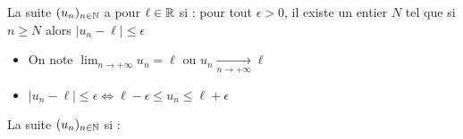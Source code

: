 \begin{frame}

\begin{mydefinition}
\label{def_lim}
  La suite $(u_n)_{n\in \mathbb{N}}$ a pour  $\ell\in \mathbb{R}$ si : 
pour tout $\epsilon >0$, il existe un entier $N$ tel que si $n\geq N$ alors 
$\lvert u_n-\ell\rvert\leq\epsilon$
\pause
{}
\end{mydefinition}

\pause
\bigskip
 \begin{itemize}
    \item On note \quad $\displaystyle \lim_{n\to +\infty}u_n=\ell$ \quad ou \quad $u_n\xrightarrow[n\to +\infty]{} \ell$
\pause
\medskip
    \item $|u_n-\ell| \le \epsilon \iff \ell-\epsilon \le u_n \le \ell +\epsilon$
 \end{itemize}
\end{frame}

\begin{frame}


\pause    
    


\end{frame}


\begin{frame}
\begin{mydefinition}  
 La suite $(u_n)_{n\in \mathbb{N}}$  si :


    
\end{mydefinition}



\pause


\end{frame}



